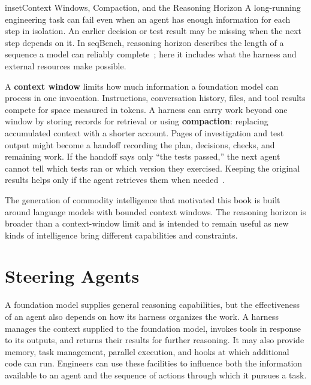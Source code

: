 \begin{bookbox}{inset}{Context Windows, Compaction, and the Reasoning Horizon}
\label{inset-context-windows-and-compaction}
A long-running engineering task can fail even when an agent has enough information for each step in isolation. An earlier decision or test result may be missing when the next step depends on it. In seqBench, reasoning horizon describes the length of a sequence a model can reliably complete~\citep{ramezanali2025seqbench}; here it includes what the harness and external resources make possible.

A \textbf{context window} limits how much information a foundation model can process in one invocation. Instructions, conversation history, files, and tool results compete for space measured in tokens. A harness can carry work beyond one window by storing records for retrieval or using \textbf{compaction}: replacing accumulated context with a shorter account. Pages of investigation and test output might become a handoff recording the plan, decisions, checks, and remaining work. If the handoff says only ``the tests passed,'' the next agent cannot tell which tests ran or which version they exercised. Keeping the original results helps only if the agent retrieves them when needed~\citep{rajasekaran2025contextengineering}.

The generation of commodity intelligence that motivated this book is built around language models with bounded context windows. The reasoning horizon is broader than a context-window limit and is intended to remain useful as new kinds of intelligence bring different capabilities and constraints.
\end{bookbox}

\section{Steering Agents}\label{heading:engineering-the-agent-environment}





A foundation model supplies general reasoning capabilities, but the effectiveness of an agent also depends on how its harness organizes the work. A harness manages the context supplied to the foundation model, invokes tools in response to its outputs, and returns their results for further reasoning. It may also provide memory, task management, parallel execution, and hooks at which additional code can run. Engineers can use these facilities to influence both the information available to an agent and the sequence of actions through which it pursues a task.

